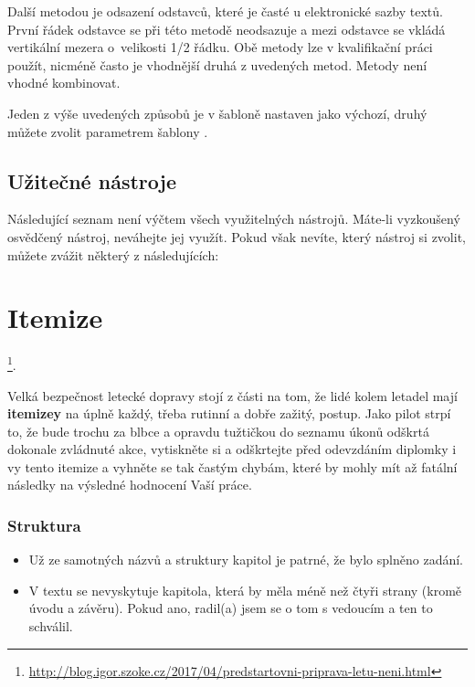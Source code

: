 Další metodou je odsazení odstavců, které je časté u elektronické sazby textů. První řádek odstavce se při této metodě neodsazuje a mezi odstavce se vkládá vertikální mezera o~velikosti 1/2 řádku. Obě metody lze v kvalifikační práci použít, nicméně často je vhodnější druhá z uvedených metod. Metody není vhodné kombinovat.

Jeden z výše uvedených způsobů je v šabloně nastaven jako výchozí, druhý můžete zvolit parametrem šablony .

\subsection*{Užitečné nástroje}
\label{nastroje}

Následující seznam není výčtem všech využitelných nástrojů. Máte-li vyzkoušený osvědčený nástroj, neváhejte jej využít. Pokud však nevíte, který nástroj si zvolit, můžete zvážit některý z následujících:


\section{Itemize} 
\label{itemize}

\footnote{\url{http://blog.igor.szoke.cz/2017/04/predstartovni-priprava-letu-neni.html}}. 

Velká bezpečnost letecké dopravy stojí z části na tom, že lidé kolem letadel mají \textbf{itemizey} na úplně každý, třeba rutinní a dobře zažitý, postup. Jako pilot strpí to, že bude trochu za blbce a opravdu tužtičkou do seznamu úkonů odškrtá dokonale zvládnuté akce, vytiskněte si a odškrtejte před odevzdáním diplomky i vy tento itemize a vyhněte se tak častým chybám, které by mohly mít až fatální následky na výsledné hodnocení Vaší práce.

\subsubsection*{Struktura}
\begin{itemize}
	\item Už ze samotných názvů a struktury kapitol je patrné, že bylo splněno zadání.
	\item V textu se nevyskytuje kapitola, která by měla méně než čtyři strany (kromě úvodu a závěru). Pokud ano, radil(a) jsem se o tom s vedoucím a ten to schválil.
\end{itemize}

